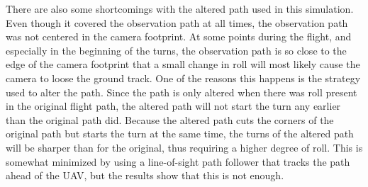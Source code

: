 There are also some shortcomings with the altered path used in this simulation. Even though it covered the observation path at all times, the observation path was not centered in the camera footprint. At some points during the flight, and especially in the beginning of the turns, the observation path is so close to the edge of the camera footprint that a small change in roll will most likely cause the camera to loose the ground track. One of the reasons this happens is the strategy used to alter the path. Since the path is only altered when there was roll present in the original flight path, the altered path will not start the turn any earlier than the original path did. Because the altered path cuts the corners of the original path but starts the turn at the same time, the turns of the altered path will be sharper than for the original, thus requiring a higher degree of roll. This is somewhat minimized by using a line-of-sight path follower that tracks the path ahead of the UAV, but the results show that this is not enough.


